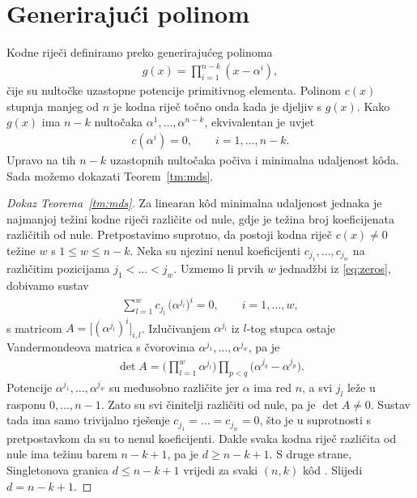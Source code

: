 \documentclass{mathos}
\begin{document}
\section{Generirajući polinom}\label{gen}

Kodne riječi definiramo preko generirajućeg polinoma
\begin{align}\label{eq:gen}
    g(x) = \prod_{i=1}^{n-k} (x - \alpha^i),
\end{align}
čije su nultočke uzastopne potencije primitivnog elementa. Polinom $c(x)$ stupnja manjeg od $n$ je kodna riječ točno onda kada je djeljiv s $g(x)$. Kako $g(x)$ ima $n-k$ nultočaka $\alpha^1, \dots, \alpha^{n-k}$, ekvivalentan je uvjet
\begin{align}\label{eq:zeros}
    c(\alpha^i) = 0, \qquad i = 1, \dots, n-k.
\end{align}
Upravo na tih $n-k$ uzastopnih nultočaka počiva i minimalna udaljenost kôda. Sada možemo dokazati Teorem~\ref{tm:mds}.

\begin{proof}[Dokaz Teorema~\ref{tm:mds}]
Za linearan kôd minimalna udaljenost jednaka je najmanjoj težini kodne riječi različite od nule, gdje je težina broj koeficijenata različitih od nule. Pretpostavimo suprotno, da postoji kodna riječ $c(x) \ne 0$ težine $w$ s $1 \le w \le n-k$. Neka su njezini nenul koeficijenti $c_{j_1}, \dots, c_{j_w}$ na različitim pozicijama $j_1 < \dots < j_w$. Uzmemo li prvih $w$ jednadžbi iz \eqref{eq:zeros}, dobivamo sustav
\begin{align*}
    \sum_{l=1}^{w} c_{j_l}\, \big(\alpha^{j_l}\big)^i = 0, \qquad i = 1, \dots, w,
\end{align*}
s matricom $A = \big[(\alpha^{j_l})^i\big]_{i,l}$. Izlučivanjem $\alpha^{j_l}$ iz $l$-tog stupca ostaje Vandermondeova matrica s čvorovima $\alpha^{j_1}, \dots, \alpha^{j_w}$, pa je
\begin{align*}
    \det A = \Big(\prod_{l=1}^{w} \alpha^{j_l}\Big) \prod_{p < q} \big(\alpha^{j_q} - \alpha^{j_p}\big).
\end{align*}
Potencije $\alpha^{j_1}, \dots, \alpha^{j_w}$ su međusobno različite jer $\alpha$ ima red $n$, a svi $j_l$ leže u rasponu $0, \dots, n-1$. Zato su svi činitelji različiti od nule, pa je $\det A \ne 0$. Sustav tada ima samo trivijalno rješenje $c_{j_1} = \dots = c_{j_w} = 0$, što je u suprotnosti s pretpostavkom da su to nenul koeficijenti. Dakle svaka kodna riječ različita od nule ima težinu barem $n-k+1$, pa je $d \ge n-k+1$. S druge strane, Singletonova granica $d \le n-k+1$ vrijedi za svaki $(n,k)$ kôd \cite[pogl.\ 1]{macwilliams}. Slijedi $d = n-k+1$.
\end{proof}
\end{document}
